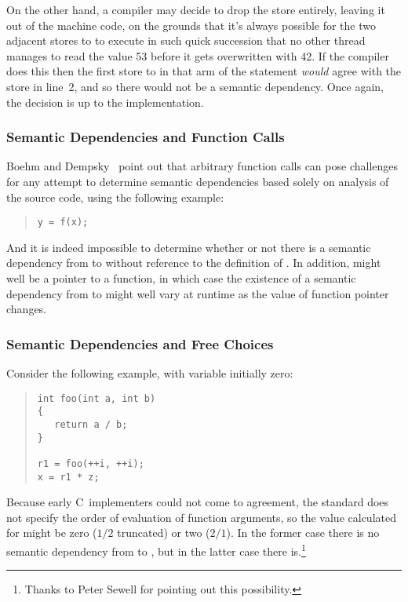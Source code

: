 On the other hand, a compiler may decide to drop the  store entirely, leaving it out of the machine code,
on the grounds that it's always possible for the two adjacent stores
to  to execute in such quick succession that no other thread
manages to read the value 53 before it gets overwritten with 42.
If the compiler does this then the first store to  in that
arm of the  statement \emph{would} agree with the store in
line~2, and so there would not be a semantic dependency.
Once again, the decision is up to the implementation.

\subsubsection{Semantic Dependencies and Function Calls}
\label{sec:Semantic Dependencies and Function Calls}

Boehm and Dempsky~\cite[Section 5]{Boehm:2014:OGA:2618128.2618134}
point out that arbitrary function calls can pose challenges for any
attempt to determine semantic dependencies based solely on analysis
of the source code, using the following example:
\begin{quote}
\begin{verbatim}
y = f(x);
\end{verbatim}
\end{quote}
And it is indeed impossible to determine whether or not there is a
semantic dependency from  to  without reference to the
definition of .
In addition,  might well be a pointer to a function, in which case
the existence of a semantic dependency from  to  might well
vary at runtime as the value of function pointer  changes.

\subsubsection{Semantic Dependencies and Free Choices}
\label{sec:Semantic Dependencies and Free Choices}

Consider the following example, with variable  initially zero:
\begin{quote}
\begin{verbatim}
int foo(int a, int b)
{
   return a / b;
}

r1 = foo(++i, ++i);
x = r1 * z;
\end{verbatim}
\end{quote}
Because early C~implementers could not come to agreement, the standard
does not specify the order of evaluation of function arguments, so
the value calculated for  might be zero ($1/2$ truncated) or two
($2/1$).
In the former case there is no semantic dependency from  to ,
but in the latter case there is.\footnote{
	Thanks to Peter Sewell for pointing out this possibility.}

